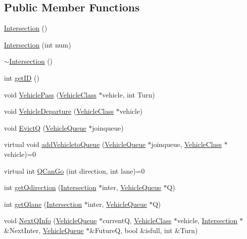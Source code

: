 \subsection*{Public Member Functions}
\begin{DoxyCompactItemize}
\item 
\hyperlink{class_intersection_a67497e3efe2793b23909052eeb82c4f3}{Intersection} ()
\item 
\hyperlink{class_intersection_ac4c8289c83f612558e3ebbb0af571235}{Intersection} (int num)
\item 
\hyperlink{class_intersection_a064951a970ed8dd11081b2903ab62122}{$\sim$\-Intersection} ()
\item 
int \hyperlink{class_intersection_af9ffdb4a85d4b9250cc74936068f8d2d}{get\-I\-D} ()
\item 
void \hyperlink{class_intersection_afe2e42381c4cf467fca7d2217d92524c}{Vehicle\-Pass} (\hyperlink{class_vehicle_class}{Vehicle\-Class} $\ast$vehicle, int Turn)
\item 
void \hyperlink{class_intersection_a358151a5ef4dd58dd42a6444c7e9bfc9}{Vehicle\-Departure} (\hyperlink{class_vehicle_class}{Vehicle\-Class} $\ast$vehicle)
\item 
void \hyperlink{class_intersection_ab6a6b34e31effdf156c39dabf523e5e8}{Evict\-Q} (\hyperlink{class_vehicle_queue}{Vehicle\-Queue} $\ast$joinqueue)
\item 
virtual void \hyperlink{class_intersection_a6e55e3add20e9d49e5751ccf47832c12}{add\-Vehicleto\-Queue} (\hyperlink{class_vehicle_queue}{Vehicle\-Queue} $\ast$joinqueue, \hyperlink{class_vehicle_class}{Vehicle\-Class} $\ast$vehicle)=0
\item 
virtual int \hyperlink{class_intersection_ade54ec591355782db542061623096a2f}{Q\-Can\-Go} (int direction, int lane)=0
\item 
int \hyperlink{class_intersection_a9304a1e23bdcc495ff95c5195b81d947}{get\-Qdirection} (\hyperlink{class_intersection}{Intersection} $\ast$inter, \hyperlink{class_vehicle_queue}{Vehicle\-Queue} $\ast$Q)
\item 
int \hyperlink{class_intersection_a2f76abb6014473396954bcaa0db18e7e}{get\-Qlane} (\hyperlink{class_intersection}{Intersection} $\ast$inter, \hyperlink{class_vehicle_queue}{Vehicle\-Queue} $\ast$Q)
\item 
void \hyperlink{class_intersection_a1cc47dcabbfb512f9cb85ff9e7114e1a}{Next\-Q\-Info} (\hyperlink{class_vehicle_queue}{Vehicle\-Queue} $\ast$current\-Q, \hyperlink{class_vehicle_class}{Vehicle\-Class} $\ast$vehicle, \hyperlink{class_intersection}{Intersection} $\ast$\&Next\-Inter, \hyperlink{class_vehicle_queue}{Vehicle\-Queue} $\ast$\&Future\-Q, bool \&isfull, int \&Turn)
\end{DoxyCompactItemize}
